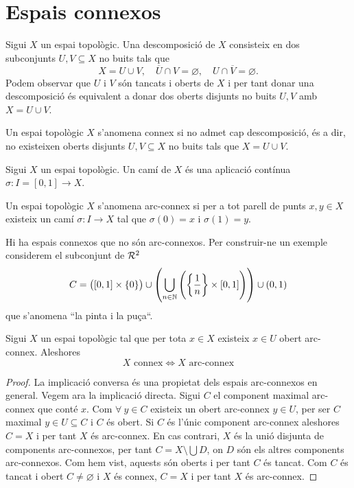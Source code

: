 \section{Espais connexos}

\begin{defi}
	Sigui $X$ un espai topològic. Una descomposició de $X$ consisteix en dos
	subconjunts $U, V \subseteq X$ no buits tals que
	\[
		X = U \cup V, \quad \overline{U} \cap V = \varnothing, \quad U \cap
		\overline{V} = \varnothing.
	\]
	Podem observar que $U$ i $V$ són tancats i oberts de $X$ i per tant
	donar una descomposició \'es equivalent a donar dos oberts disjunts no buits
	$U, V$ amb $X = U \cup V$.
\end{defi}

\begin{defi}
	Un espai topològic $X$ s'anomena connex si no admet cap descomposició, és
	a dir, no existeixen oberts disjunts $U, V \subseteq X$ no buits tals que
	$X = U \cup V$.
\end{defi}

\begin{defi}
	Sigui $X$ un espai topològic. Un camí de $X$ \'es una aplicació contínua
	$\sigma : I = [0, 1] \longrightarrow X$.
\end{defi}

\begin{defi}
	Un espai topològic $X$ s'anomena arc-connex si per a tot parell de punts
	$x, y \in X$ existeix un camí $\sigma: I \longrightarrow X$ tal que $\sigma(0)
	= x$ i $\sigma(1) = y$.
\end{defi}

\begin{example}
	Hi ha espais connexos que no són arc-connexos. Per construir-ne un exemple
	considerem el subconjunt de $\mathcal{R}^2$
	\[ 
		C = \left([0, 1] \times \{0\}\right) \cup \left( 
		\bigcup \limits_{n \in \mathbb{N}} \left( \left\{  \frac{1}{n} \right\} 
		\times [0, 1] \right) \right) \cup \left( 0, 1\right)
	\]
	que s'anomena ``la pinta i la puça``.
\end{example}
\begin{prop}
	Sigui $X$ un espai topològic tal que per tota $x \in X$ existeix $x \in U$
	obert arc-connex. Aleshores 
	\[X \text{ connex} \iff X \text{ arc-connex}\]
\end{prop}

\begin{proof}
	La implicació conversa \'es una propietat dels espais arc-connexos en general.
	Vegem ara la implicació directa. Sigui $C$ el component maximal arc-connex 
	que conté $x$. Com $\forall \: y \in C$ existeix un obert arc-connex $y \in
	U$, per ser $C$ maximal $y \in U \subseteq C$ i $C$ \'es obert. Si $C$
	és l'únic component arc-connex aleshores $C = X$ i per tant $X$ és arc-connex.
	En cas contrari, $X$ és la unió disjunta de components arc-connexos, per tant
	$C = X \setminus \bigcup D$, on $D$ són els altres components arc-connexos.
	Com hem vist, aquests són oberts i per tant $C$ és tancat. Com $C$ és tancat
	i obert $C \neq \varnothing$ i $X$ és connex, $C = X$ i per tant $X$ és
	arc-connex.
\end{proof}
